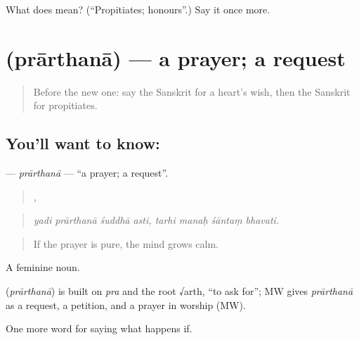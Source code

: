 \begin{tcolorbox}[breakable,colback=teal!4,colframe=teal!35!black,title={Before you move on}]
What does  mean? (\textquotedblleft{}Propitiates; honours\textquotedblright{}.) Say it once more.
\end{tcolorbox}
\section[\texorpdfstring{\sk{प्रार्थना} (prārthanā)}{प्रार्थना (prārthanā)}]{ (prārthanā) — a prayer; a request}

\label{lesson:SA-C531-prarthana}



\begin{quote}
Before the new one: say the Sanskrit for a heart's wish, then the Sanskrit for propitiates.
\end{quote}

\subsection*{You'll want to know: }
\textbf{} — \emph{prārthanā} — \textquotedblleft{}a prayer; a request\textquotedblright{}.

\begin{quote}
   ,    
\end{quote}

\begin{quote}
\emph{yadi prārthanā śuddhā asti, tarhi manaḥ śāntaṃ bhavati.}
\end{quote}

\begin{quote}
If the prayer is pure, the mind grows calm.
\end{quote}

A feminine noun.

\begin{cousinweb}
\textbf{} (\emph{prārthanā}) is built on \emph{pra} and the root √arth, \textquotedblleft{}to ask for\textquotedblright{}; MW gives \emph{prārthanā} as a request, a petition, and a prayer in worship (MW).
\end{cousinweb}

\begin{grammarlens}[title={What you've built}]
One more word for saying what happens if.
\end{grammarlens}

